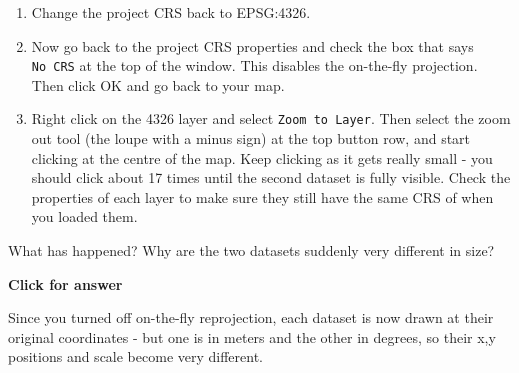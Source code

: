 \documentclass[
  letterpaper,
  DIV=11,
  numbers=noendperiod]{scrreprt}
\begin{document}
\begin{enumerate}
\def\labelenumi{(\arabic{enumi})}
\setcounter{enumi}{59}
\item
  Change the project CRS back to EPSG:4326.
\item
  Now go back to the project CRS properties and check the box that says
  \texttt{No\ CRS} at the top of the window. This disables the
  on-the-fly projection. Then click OK and go back to your map.
\item
  Right click on the 4326 layer and select \texttt{Zoom\ to\ Layer}.
  Then select the zoom out tool (the loupe with a minus sign) at the top
  button row, and start clicking at the centre of the map. Keep clicking
  as it gets really small - you should click about 17 times until the
  second dataset is fully visible. Check the properties of each layer to
  make sure they still have the same CRS of when you loaded them.
\end{enumerate}

\begin{tcolorbox}[enhanced jigsaw, breakable, toptitle=1mm, colback=white, left=2mm, leftrule=.75mm, titlerule=0mm, colframe=quarto-callout-important-color-frame, opacityback=0, title=\textcolor{quarto-callout-important-color}{\faExclamation}\hspace{0.5em}{Stop and Think}, toprule=.15mm, opacitybacktitle=0.6, bottomtitle=1mm, colbacktitle=quarto-callout-important-color!10!white, bottomrule=.15mm, coltitle=black, rightrule=.15mm, arc=.35mm]

What has happened? Why are the two datasets suddenly very different in
size?

\end{tcolorbox}

\begin{tcolorbox}[enhanced jigsaw, leftrule=.75mm, colframe=quarto-callout-important-color-frame, breakable, toprule=.15mm, bottomrule=.15mm, arc=.35mm, rightrule=.15mm, opacityback=0, colback=white, left=2mm]

\vspace{-3mm}\textbf{Click for answer}\vspace{3mm}

Since you turned off on-the-fly reprojection, each dataset is now drawn
at their original coordinates - but one is in meters and the other in
degrees, so their x,y positions and scale become very different.

\end{tcolorbox}
\end{document}
